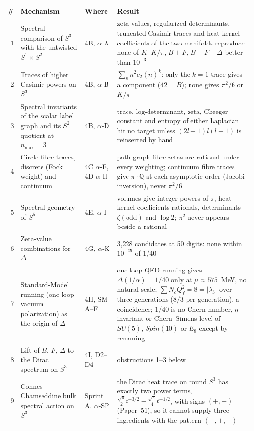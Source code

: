 \documentclass[aps,prl,twocolumn,superscriptaddress]{revtex4-2}
\begin{document}
\begin{table}[tp]
\centering
\begin{tabular}{rp{}p{}p{}}
\hline\hline
\# & Mechanism & Where & Result \\
\hline
1 & Spectral comparison of $S^3$ with the untwisted $S^1\times S^2$ & 4B, $\alpha$-A &
 zeta values, regularized determinants, truncated Casimir traces and heat-kernel coefficients of the two manifolds reproduce none of $K$, $K/\pi$, $B+F$, $B+F-\Delta$ better than $10^{-3}$ \\
2 & Traces of higher Casimir powers on $S^3$ & 4B, $\alpha$-B &
 $\sum_n n^2 c_2(n)^k$: only the $k=1$ trace gives a component ($42 = B$); none gives $\pi^2/6$ or $K/\pi$ \\
3 & Spectral invariants of the scalar label graph and its $S^2$ quotient at $n_{\max}=3$ & 4B, $\alpha$-D &
 trace, log-determinant, zeta, Cheeger constant and entropy of either Laplacian hit no target unless $(2l+1)l(l+1)$ is reinserted by hand \\
4 & Circle-fibre traces, discrete (Fock weight) and continuum & 4C $\alpha$-E, 4D $\alpha$-H &
 path-graph fibre zetas are rational under every weighting; continuum fibre traces give $\pi\cdot\mathbb{Q}$ at each asymptotic order (Jacobi inversion), never $\pi^2/6$ \\
5 & Spectral geometry of $S^5$ & 4E, $\alpha$-I &
 volumes give integer powers of $\pi$, heat-kernel coefficients rationals, determinants $\zeta(\mathrm{odd})$ and $\log 2$; $\pi^2$ never appears beside a rational \\
6 & Zeta-value combinations for $\Delta$ & 4G, $\alpha$-K &
 3{,}228 candidates at 50 digits: none within $10^{-25}$ of $1/40$ \\
7 & Standard-Model running (one-loop vacuum polarization) as the origin of $\Delta$ & 4H, SM-A--F &
 one-loop QED running gives $\Delta(1/\alpha) = 1/40$ only at $\mu \approx 575$~MeV, no natural scale; $\sum N_cQ_f^2 = 8 = |\lambda_3|$ over three generations ($8/3$ per generation), a coincidence; $1/40$ is no Chern number, $\eta$-invariant or Chern--Simons level of $SU(5)$, $Spin(10)$ or $E_8$ except by renaming \\
8 & Lift of $B$, $F$, $\Delta$ to the Dirac spectrum on $S^3$ & 4I, D2--D4 &
 obstructions 1--3 below \\
9 & Connes--Chamseddine bulk spectral action on $S^3$ & Sprint A, $\alpha$-SP &
 the Dirac heat trace on round $S^3$ has exactly two power terms, $\tfrac{\sqrt{\pi}}{2}t^{-3/2} - \tfrac{\sqrt{\pi}}{4}t^{-1/2}$, with signs $(+,-)$ (Paper~51), so it cannot supply three ingredients with the pattern $(+,+,-)$ \\

\end{tabular}
\end{table}
\end{document}
